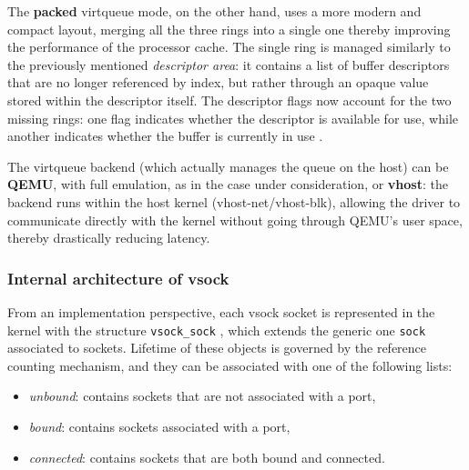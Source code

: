 


The \textbf{packed} virtqueue mode, on the other hand, uses a more modern and compact layout, merging all the three rings into a single one thereby improving the performance of the processor cache. The single ring is managed similarly to the previously mentioned \emph{descriptor area}: it contains a list of buffer descriptors that are no longer referenced by index, but rather through an opaque value stored within the descriptor itself. The descriptor flags now account for the two missing rings: one flag indicates whether the descriptor is available for use, while another indicates whether the buffer is currently in use \cite{bib:packed-virtqueue}.

The virtqueue backend (which actually manages the queue on the host) can be \textbf{QEMU}, with full emulation, as in the case under consideration, or \textbf{vhost}: the backend runs within the host kernel (vhost-net/vhost-blk), allowing the driver to communicate directly with the kernel without going through QEMU's user space, thereby drastically reducing latency.

\subsubsection{Internal architecture of vsock}
From an implementation perspective, each vsock socket is represented in the kernel with the structure \texttt{vsock\_sock} \cite{bib:af-vsock-code}, which extends the generic one \texttt{sock} \cite{bib:struct-sock} associated to sockets. Lifetime of these objects is governed by the reference counting mechanism, and they can be associated with one of the following lists:
\begin{itemize}
\item \textit{unbound}: contains sockets that are not associated with a port,
\item \textit{bound}: contains sockets associated with a port,
\item \textit{connected}: contains sockets that are both bound and connected.
\end{itemize}

